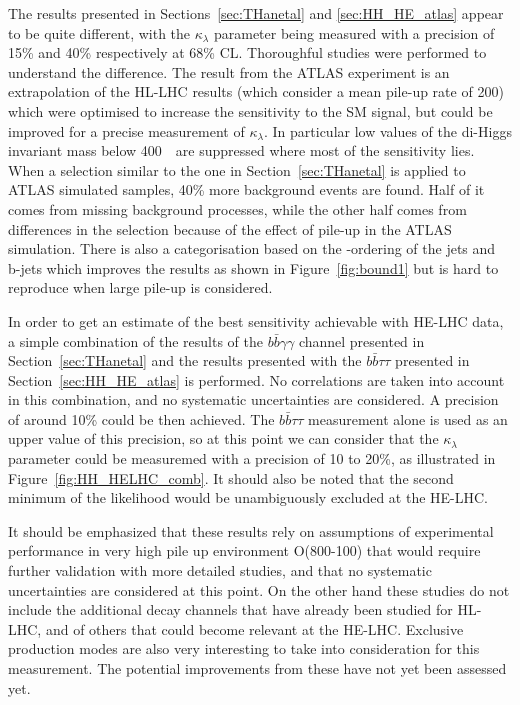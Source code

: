 The results presented in Sections~\ref{sec:THanetal} and \ref{sec:HH_HE_atlas} appear to be quite different, with the $\kappa_{\lambda}$ parameter being measured with a precision of 15\% and 40\% respectively at 68\% CL.
Thoroughful studies were performed to understand the difference. The result from the ATLAS experiment is an extrapolation of the HL-LHC results (which consider a mean pile-up rate of 200) which were optimised to increase the sensitivity to the SM signal, but could be improved for a precise measurement of $\kappa_{\lambda}$. In particular low values of the di-Higgs invariant mass below 400~\GeV\ are suppressed where most of the sensitivity lies.
When a selection similar to the one in Section~\ref{sec:THanetal} is applied to ATLAS simulated samples, 40\% more background events are found. Half of it comes from missing background processes, while the other half comes from differences in the selection because of the effect of pile-up in the ATLAS simulation.
There is also a categorisation based on the \pT-ordering of the jets and b-jets which improves the results as shown in Figure~\ref{fig:bound1} but is hard to reproduce when large pile-up is considered.


In order to get an estimate of the best sensitivity achievable with HE-LHC data, a simple combination of the results of the $b\bar{b}\gamma\gamma$ channel presented in Section~\ref{sec:THanetal} and the results presented with the $b\bar{b}\tau\tau$ presented in Section~\ref{sec:HH_HE_atlas} is performed. No correlations are taken into account in this combination, and no systematic uncertainties are considered. A precision of around 10\% could be then achieved. The $b\bar{b}\tau\tau$ measurement alone is used as an upper value of this precision, so at this point we can consider that the $\kappa_{\lambda}$ parameter could be measuremed with a precision of 10 to 20\%, as illustrated in Figure~\ref{fig:HH_HELHC_comb}. It should also be noted that the second minimum of the likelihood would be unambiguously excluded at the HE-LHC.

It should be emphasized that these results rely on assumptions of experimental performance in very high pile up environment O(800-100) that would require further validation with more detailed studies, and that no systematic uncertainties are considered at this point. On the other hand these studies do not include the additional decay channels that have already been studied for HL-LHC, and of others that could become relevant at the HE-LHC. Exclusive production modes are also very interesting to take into consideration for this measurement. The potential improvements from these have not yet been assessed yet.


